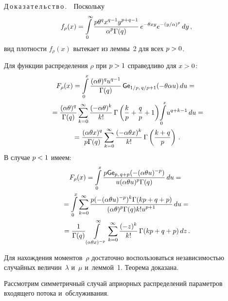 \begin{multicols}{2}
\smallskip

\noindent
Д\,о\,к\,а\,з\,а\,т\,е\,л\,ь\,с\,т\,в\,о\,.\ \ Поскольку
$$
f_\rho(x) = \int\limits_0^{\infty} \displaystyle\frac{\displaystyle p \theta^q x^{q-1} y^{p+q-1}\mathstrut}{\displaystyle \alpha^p \Gamma(q)\mathstrut}\,e^{-\theta x y}e^{- (y/\alpha)^p} \, dy\,,
$$
вид плотности $f_\rho(x)$ вытекает из леммы~2 для всех $p\hm>0$.

Для функции распределения $\rho$ при $p\hm>1$ справедливо для $x\hm>0$:
\begin{multline*}
F_\rho(x) = \int\limits_{0}^{x} \displaystyle\frac{\displaystyle (\alpha \theta)^q u^{q-1}\mathstrut}{\displaystyle {\Gamma(q)}\mathstrut} 
\,{\sf Ge}_{1/p,\, q/p+1} (-\theta \alpha u) \, du ={}\\
{}= \displaystyle\frac{\displaystyle (\alpha \theta)^q \mathstrut}{\displaystyle {\Gamma(q)}\mathstrut} \sum\limits_{k=0}^\infty 
\displaystyle\frac{\displaystyle (-\alpha \theta )^k\mathstrut}{\displaystyle k!\mathstrut}\, \Gamma\left(\displaystyle\frac{\displaystyle k\mathstrut}{\displaystyle p\mathstrut} + \displaystyle\frac{\displaystyle q\mathstrut}{\displaystyle p\mathstrut} + 1\right) 
\!\int\limits_{0}^{x}\!u^{q+k-1}\,du ={}\hspace*{-4.39256pt}\\
{}= \displaystyle\frac{\displaystyle (\alpha \theta x)^q \mathstrut}{\displaystyle p\Gamma(q)\mathstrut} 
\sum\limits_{k=0}^\infty \displaystyle\frac{\displaystyle (-\alpha \theta x)^k\mathstrut}{\displaystyle k!\mathstrut}\, \Gamma\left(\displaystyle\frac{\displaystyle k+q\mathstrut}{\displaystyle p\mathstrut}\right)\,.
\end{multline*}
В случае $p\hm<1$ имеем:
\begin{multline*}
F_\rho(x) = \int\limits_{0}^{x}\displaystyle\frac{\displaystyle p{\sf Ge}_{p,\, q+p} 
(-(\alpha \theta u)^{-p})\mathstrut}{\displaystyle u(\alpha \theta u)^{p}\Gamma(q)\mathstrut} \, du={}\\
{} = \int\limits_{0}^{x} \sum\limits_{k=0}^\infty 
\displaystyle\frac{\displaystyle p(-(\alpha \theta u)^{-p})^k\Gamma(kp + q + p)\mathstrut}{\displaystyle {(\alpha \theta)^{p}\Gamma(q)k!u^{p+1}}\mathstrut}  \, du={}\\
{}=\displaystyle\frac{\displaystyle 1\mathstrut}{\displaystyle {\Gamma(q)}\mathstrut}\int\limits_{(\alpha \theta x)^{-p}}^{\infty} 
 \sum\limits_{k=0}^\infty \displaystyle\frac{\displaystyle (-z)^k\mathstrut}{\displaystyle k!\mathstrut}\, \Gamma(kp + q + p) \, dz\,.
 \end{multline*}

Для нахождения моментов~$\rho$ достаточно воспользоваться 
независимостью случайных величин~$\lambda$ и~$\mu$ и~леммой~1.
Теорема доказана.

\smallskip

Рассмотрим симметричный случай априорных распределений параметров входящего потока 
и~обслуживания.

\smallskip


\end{multicols}
